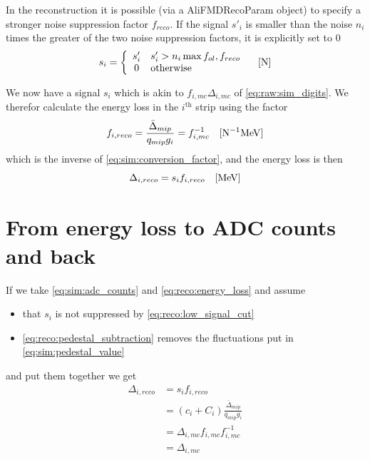 \documentclass[11pt]{article}
\def\MeV#1{\unit[#1]{MeV}}
\def\N#1{\unit[#1]{N}}
\def\class#1{{\small\ttfamily #1}}
\def\DeltaMip{\ensuremath{\bar{\Delta}_{mip}}}
\begin{document}
In the reconstruction it is possible (via a \class{AliFMDRecoParam}
object) to specify a stronger noise suppression factor $f_{reco}$.  If
the signal $s'_i$ is smaller than the noise $n_i$ times the greater of
the two noise suppression factors, it is explicitly set to 0 
\begin{equation}
  \label{eq:reco:low_signal_cut}
  s_i = \left\{\begin{array}{cl}
    s'_i & s'_i > n_i \max{f_{ol},f_{reco}}\\
      0 & \text{otherwise}
    \end{array}\right.\quad[\N{}]
  \end{equation}

We now have a signal $s_i$ which is akin to $f_{i,mc}\Delta_{i,mc}$ of
\eqref{eq:raw:sim_digits}.  We therefor calculate the energy loss in
the $i^{\text{th}}$ strip using the factor 
\begin{equation}
  \label{eq:reco:conversion_factor}
  f_{i,reco} = \frac{\DeltaMip{}}{q_{mip} g_i} = f_{i,mc}^{-1}
  \quad[\N{}^{-1}\MeV{}]
\end{equation}
which is the inverse of \eqref{eq:sim:conversion_factor}, and the
energy loss is then  
\begin{equation}
  \label{eq:reco:energy_loss}
  \Delta_{i,reco} = s_i f_{i,reco}\quad[\MeV{}]
\end{equation}

\section*{From energy loss to ADC counts and back}

If we take \eqref{eq:sim:adc_counts} and \eqref{eq:reco:energy_loss}
and assume 
\begin{itemize}
\item that $s_i$ is not suppressed by \eqref{eq:reco:low_signal_cut}
\item \eqref{eq:reco:pedestal_subtraction} removes the fluctuations
  put in \eqref{eq:sim:pedestal_value}
\end{itemize}
and put them together we get 
\begin{align}
  \label{eq:all:all}
  \Delta_{i,reco} &= s_i f_{i,reco}\nonumber\\
  &= (c_i + C_i) \frac{\DeltaMip{}}{q_{mip} g_i}\nonumber\\
  &= \Delta_{i,mc} f_{i,mc}  f_{i,mc}^{-1}\nonumber\\
  &= \Delta_{i,mc}
\end{align}
\end{document}

